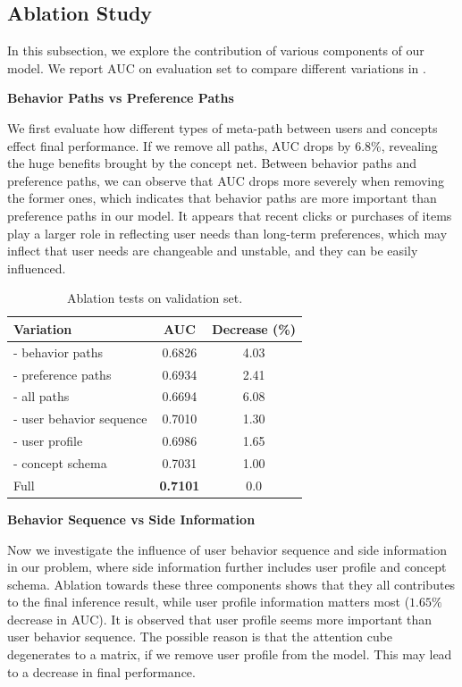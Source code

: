 \subsection{Ablation Study}
In this subsection, we explore the contribution of various components of our model.
We report AUC on evaluation set to compare different variations in .


\noindent
\textbf{Behavior Paths vs Preference Paths}

\noindent
We first evaluate how different types of meta-path between users and concepts effect final performance. 
If we remove all paths, AUC drops by $6.8\%$, 
revealing the huge benefits brought by the concept net.
Between behavior paths and preference paths,
we can observe that AUC drops more severely when removing the former ones,
which indicates that behavior paths are more important than preference paths in our model.
It appears that recent clicks or purchases of items play a larger role 
in reflecting user needs than long-term preferences,
which may inflect that user needs are changeable and unstable, and they can be easily influenced.
\begin{table}[th]
	\centering
	\begin{tabular}{l|c|c}
		\hline
		Variation  & AUC   & Decrease (\%)\\
		\hline
		- behavior paths  &  0.6826 & 4.03\\
		- preference paths  & 0.6934 & 2.41\\
		- all paths & 0.6694 & 6.08\\
		\hline
		\hline
		- user behavior sequence & 0.7010 & 1.30\\
		- user profile & 0.6986 &  1.65\\
		- concept schema & 0.7031 & 1.00\\
		\hline
		\hline
		Full  &  \textbf{0.7101} & 0.0 \\ 
		\hline
	\end{tabular}
	\caption{Ablation tests on validation set.}
	\label{tab:ablation}
\end{table}

\noindent
\textbf{Behavior Sequence vs Side Information}

\noindent
Now we investigate the influence of user behavior sequence and side information in our problem,
where side information further includes user profile and concept schema.
Ablation towards these three components shows that they all contributes to the final inference result, 
while user profile information matters most ($1.65\%$ decrease in AUC).
It is observed that user profile seems more important than user behavior sequence.
The possible reason is that the attention cube degenerates to a matrix, if we remove user profile from the model.
This may lead to a decrease in final performance.



